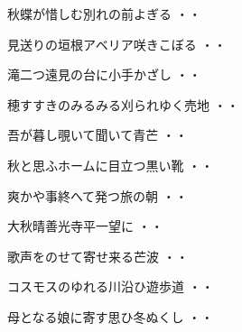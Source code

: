 \vspace{0.6cm}
\begin{shiika}秋蝶が惜しむ別れの前よぎる
\hfill{・・}\end{shiika}
\vspace{0.6cm}
\begin{shiika}見送りの垣根アベリア咲きこぼる
\hfill{・・}\end{shiika}
\vspace{0.6cm}
\begin{shiika}滝二つ遠見の台に小手かざし
\hfill{・・}\end{shiika}
\vspace{0.6cm}
\begin{shiika}穂すすきのみるみる刈られゆく売地
\hfill{・・}\end{shiika}
\vspace{0.6cm}
\begin{shiika}吾が暮し覗いて聞いて青芒
\hfill{・・}\end{shiika}
\vspace{0.6cm}
\begin{shiika}秋と思ふホームに目立つ黒い靴
\hfill{・・}\end{shiika}
\vspace{0.6cm}
\begin{shiika}爽かや事終へて発つ旅の朝
\hfill{・・}\end{shiika}
\vspace{0.6cm}
\begin{shiika}大秋晴善光寺平一望に
\hfill{・・}\end{shiika}
\vspace{0.6cm}
\begin{shiika}歌声をのせて寄せ来る芒波
\hfill{・・}\end{shiika}
\vspace{0.6cm}
\begin{shiika}コスモスのゆれる川沿ひ遊歩道
\hfill{・・}\end{shiika}
\vspace{0.6cm}
\begin{shiika}母となる娘に寄す思ひ冬ぬくし
\hfill{・・}\end{shiika}
